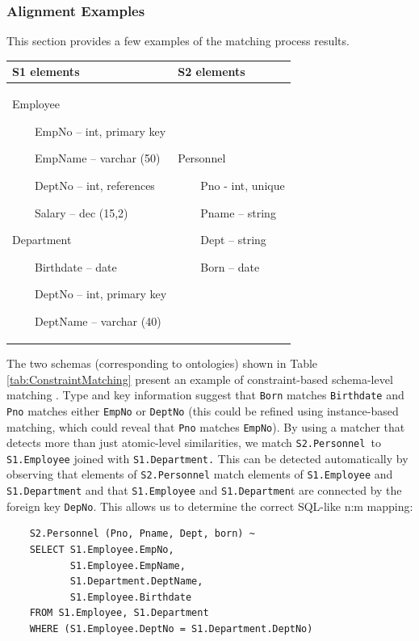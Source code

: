 \documentclass{fast_latex}
\begin{document}
\subsubsection{Alignment Examples}
This section provides a few examples of the matching
process{\textquotesingle} results.
\begin{center}
\label{tab:ConstraintMatching}
\tablehead{}
\begin{supertabular}{|m{0.4\textwidth}|m{0.4\textwidth}|}
\hline
S1 elements &
S2 elements\\\hline
Employee

\ \ \ \ EmpNo -- int, primary key

\ \ \ \ EmpName -- varchar (50)

\ \ \ \ DeptNo -- int, references 

\ \ \ \ Salary -- dec (15,2)

Department

\ \ \ \ Birthdate -- date

\ \ \ \ DeptNo -- int, primary key

\ \ \ \ DeptName -- varchar (40) &
Personnel

\ \ \ \ Pno - int, unique

\ \ \ \ Pname -- string

\ \ \ \ Dept -- string

\ \ \ \ Born -- date\\\hline
\end{supertabular}
\end{center}
The two schemas (corresponding to ontologies) shown in Table \ref{tab:ConstraintMatching} present
an example of constraint-based schema-level matching \cite{rahm01survey}. Type and key information suggest that
\texttt{Born} matches \texttt{Birthdate} and
\texttt{Pno} matches either \texttt{EmpNo} or
\texttt{DeptNo} (this could be refined using
instance-based matching, which could reveal that
\texttt{Pno} matches \texttt{EmpNo}). By
using a matcher that detects more than just atomic-level similarities,
we match \texttt{S2.Personnel }to
\texttt{S1.Employee} joined with
\texttt{S1.Department.} This can be detected automatically
by observing that elements of \texttt{S2.Personnel} match
elements of \texttt{S1.Employee} and
\texttt{S1.Department} and that
\texttt{S1.Employee} and
\texttt{S1.Departmen}t are connected by the foreign key
\texttt{DepNo}. This allows us to determine the correct
SQL-like n:m mapping:
\begin{verbatim}
    S2.Personnel (Pno, Pname, Dept, born) ~
    SELECT S1.Employee.EmpNo,
           S1.Employee.EmpName,
           S1.Department.DeptName,
           S1.Employee.Birthdate
    FROM S1.Employee, S1.Department
    WHERE (S1.Employee.DeptNo = S1.Department.DeptNo)
\end{verbatim}
\end{document}
